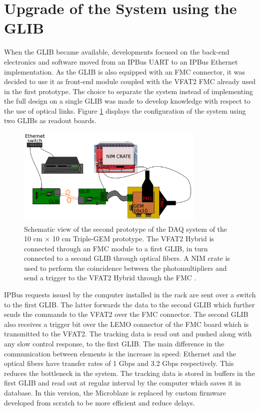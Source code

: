   \section{Upgrade of the System using the GLIB}
  \label{sec:III-1-glib}

    When the GLIB became available, developments focused on the back-end electronics and software moved from an IPBus UART to an IPBus Ethernet implementation. As the GLIB is also equipped with an FMC connector, it was decided to use it as front-end module coupled with the VFAT2 FMC already used in the first prototype. The choice to separate the system instead of implementing the full design on a single GLIB was made to develop knowledge with respect to the use of optical links. Figure \ref{fig:III-1-sys-2} displays the configuration of the system using two GLIBs as readout boards. \\

    \begin{figure}[t!]
      \centering
      \includegraphics[width=0.8\textwidth]{img/III-1-arch/sys_2.png}
      \caption{Schematic view of the second prototype of the DAQ system of the 10 cm $ \times $ 10 cm Triple-GEM prototype. The VFAT2 Hybrid is connected through an FMC module to a first GLIB, in turn connected to a second GLIB through optical fibers. A NIM crate is used to perform the coincidence between the photomultipliers and send a trigger to the VFAT2 Hybrid through the FMC \cite{Leonard:2065693}.}
      \label{fig:III-1-sys-2}
    \end{figure}

    IPBus requests issued by the computer installed in the rack are sent over a switch to the first GLIB. The latter forwards the data to the second GLIB which further sends the commands to the VFAT2 over the FMC connector. The second GLIB also receives a trigger bit over the LEMO connector of the FMC board which is transmitted to the VFAT2. The tracking data is read out and pushed along with any slow control response, to the first GLIB. The main difference in the communication between elements is the increase in speed: Ethernet and the optical fibers have transfer rates of 1 Gbps and 3.2 Gbps respectively. This reduces the bottleneck in the system. The tracking data is stored in buffers in the first GLIB and read out at regular interval by the computer which saves it in database. In this version, the Microblaze is replaced by custom firmware developed from scratch to be more efficient and reduce delays.

